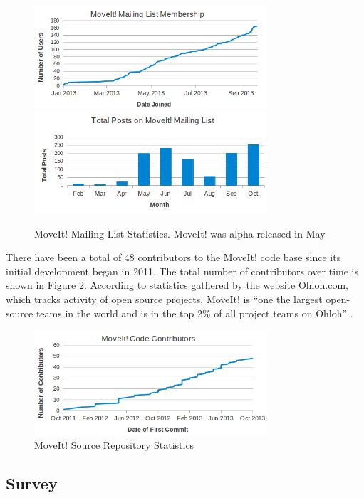 \documentclass[10pt,journal,compsoc]{joser1}
\begin{document}
{\begin{figure}[!t]
\centering
\includegraphics[width=3.4in]{coleman_20131110_f11}
\includegraphics[width=3.4in]{coleman_20131110_f12}
\caption{MoveIt! Mailing List Statistics. MoveIt! was alpha released in May}
\label{fig:membership_plot}
\end{figure}

There have been a total of 48 contributors to the MoveIt! code base since its initial development began in 2011. The total number of contributors over time is shown in Figure \ref{fig:contributors}. According to statistics gathered by the website Ohloh.com, which tracks activity of open source projects, MoveIt! is ``one the largest open-source teams in the world and is in the top 2\% of all project teams on Ohloh'' \cite{ohloh}.

\begin{figure}[!t]
\centering
\includegraphics[width=3.4in]{coleman_20131110_f13}
\caption{MoveIt! Source Repository Statistics}
\label{fig:contributors}
\end{figure}

\subsection{Survey}
\label{sec::survey}

}
\end{document}

